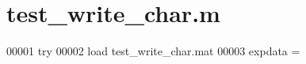\hypertarget{test__write__char_8m_source}{}\section{test\+\_\+write\+\_\+char.\+m}
\label{test__write__char_8m_source}

\begin{DoxyCode}
00001 \textcolor{keywordflow}{try}
00002     load test\_write\_char.mat
00003     expdata = \end{DoxyCode}
